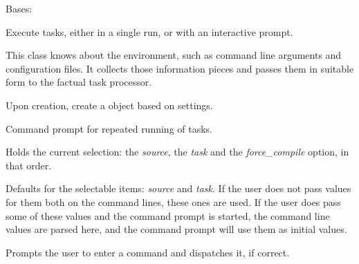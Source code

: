 \documentclass[letterpaper,10pt,english]{sphinxmanual}
\begin{document}
\begin{fulllineitems}
\label{graf/graf:graf.shell.Shell}
Bases: 

Execute tasks, either in a single run, or with an interactive prompt.

This class knows about the environment, such as command line arguments
and configuration files.
It collects those information pieces and passes them in suitable form
to the factual task processor.

Upon creation, create a {\hyperref[graf/graf:graf.task.GrafTask]{}} object based on settings.

\begin{fulllineitems}
\label{graf/graf:graf.shell.Shell.command_loop}
Command prompt for repeated running of tasks.

\end{fulllineitems}


\begin{fulllineitems}
\label{graf/graf:graf.shell.Shell.cur}
Holds the current selection: the \emph{source}, the \emph{task} and the \emph{force\_compile} option, in that order.

\end{fulllineitems}


\begin{fulllineitems}
\label{graf/graf:graf.shell.Shell.default}
Defaults for the selectable items: \emph{source} and \emph{task}.
If the user does not pass values for them both on the command lines, these ones are used.
If the user does pass some of these values and the command prompt is started, the
command line values are parsed here, and the command prompt will use them as initial values.

\end{fulllineitems}


\begin{fulllineitems}
\label{graf/graf:graf.shell.Shell.do_command}
Prompts the user to enter a command and dispatches it, if correct.


\end{fulllineitems}
\end{fulllineitems}
\end{document}

